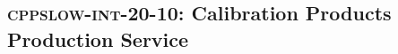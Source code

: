 \subsection{\textsc{cppslow-int-20-10}: Calibration Products Production Service}
\label{cppslow-int-20-10}
